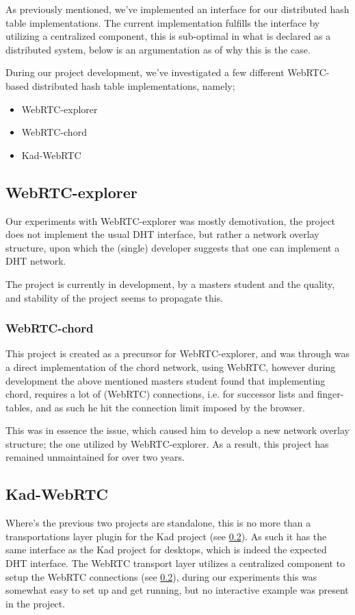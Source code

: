 
As previously mentioned, we've implemented an interface for our distributed
hash table implementations. The current implementation fulfills the interface
by utilizing a centralized component, this is sub-optimal in what is declared
as a distributed system, below is an argumentation as of why this is the case.

During our project development, we've investigated a few different WebRTC-based
distributed hash table implementations, namely;
\begin{itemize}
\item WebRTC-explorer
\item WebRTC-chord
\item Kad-WebRTC
\end{itemize}

\subsection{WebRTC-explorer}
Our experiments with WebRTC-explorer was mostly demotivation, the project does
not implement the usual DHT interface, but rather a network overlay structure,
upon which the (single) developer suggests that one can implement a DHT network.

The project is currently in development, by a masters student and the quality,
and stability of the project seems to propagate this.

\subsubsection{WebRTC-chord}
This project is created as a precursor for WebRTC-explorer, and was through was
a direct implementation of the chord network, using WebRTC, however during 
development the above mentioned masters student found that implementing chord,
requires a lot of (WebRTC) connections, i.e. for successor lists and
finger-tables, and as such he hit the connection limit imposed by the browser.

This was in essence the issue, which caused him to develop a new network
overlay structure; the one utilized by WebRTC-explorer. As a result, this 
project has remained unmaintained for over two years.

\subsection{Kad-WebRTC}
Where's the previous two projects are standalone, this is no more than a 
transportations layer plugin for the Kad project (see \ref{}). As such it 
has the same interface as the Kad project for desktops, which is indeed the 
expected DHT interface. The WebRTC transport layer utilizes a centralized 
component to setup the WebRTC connections (see \ref{}), during our experiments
this was somewhat easy to set up and get running, but no interactive example
was present in the project.

